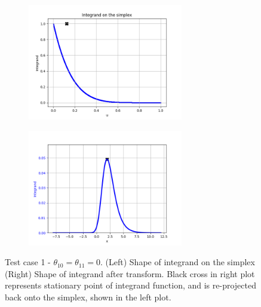 \begin{figure}[!htb]
\begin{center}
\begin{subfigure}%
    \centering
    \includegraphics[height=2in]{Chap6_EvaluationAndAnalysis/images/Simplex_model_D_1_1_0_0_N_3_3.png}
\end{subfigure}
\begin{subfigure}%
    \centering
    \includegraphics[height=2in]{Chap6_EvaluationAndAnalysis/images/Real_model_D_1_1_0_0_N_3_3.png}
\end{subfigure}
\caption{Test case 1 - \(\theta_{10}=\theta_{11}=0\). (Left) Shape of integrand on the simplex (Right) Shape of integrand after transform. Black cross in right plot represents stationary point of integrand function, and is re-projected back onto the simplex, shown in the left plot.}
\label{fig:spec_model_D_1_1_0_0_N_3_3}
\end{center}
\end{figure}

